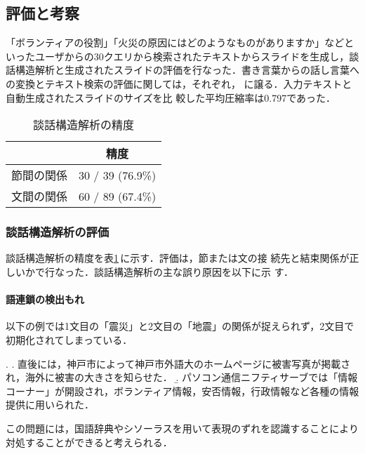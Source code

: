 \subsection{評価と考察}

「ボランティアの役割」「火災の原因にはどのようなものがありますか」などと
いったユーザからの30クエリから検索されたテキストからスライドを生成し，談
話構造解析と生成されたスライドの評価を行なった．書き言葉からの話し言葉へ
の変換とテキスト検索の評価に関しては，それぞれ\cite{Kaji02,Kaji04}，
\cite{Kiyota02}に譲る．入力テキストと自動生成されたスライドのサイズを比
較した平均圧縮率は0.797であった．

\begin{center}
\begin{table}[t]
\small
\caption{談話構造解析の精度}
\label{tab:evaluation}
\begin{center}
 \begin{tabular}[tb]{c|c}
 \hline
  & 精度 \\ \hline
 節間の関係 & 30 / 39 (76.9\%)  \\ \hline
 文間の関係 & 60 / 89 (67.4\%)  \\ \hline
 \end{tabular}
\end{center}
\end{table}
\end{center}

\subsubsection{談話構造解析の評価}

談話構造解析の精度を表\ref{tab:evaluation}\,に示す．評価は，節または文の接
続先と結束関係が正しいかで行なった．談話構造解析の主な誤り原因を以下に示
す．

\paragraph{語連鎖の検出もれ}

以下の例では1文目の「震災」と2文目の「地震」の関係が捉えられず，2文目で
初期化されてしまっている．

\ex. \a. 直後には，神戸市によって神戸市外語大のホームページに被害写真が掲載され，海外に被害の大きさを知らせた．
 \b. パソコン通信ニフティサーブでは「情報コーナー」が開設され，ボランティア情報，安否情報，行政情報など各種の情報提供に用いられた．

この問題には，国語辞典やシソーラスを用いて表現のずれを認識することにより
対処することができると考えられる．


